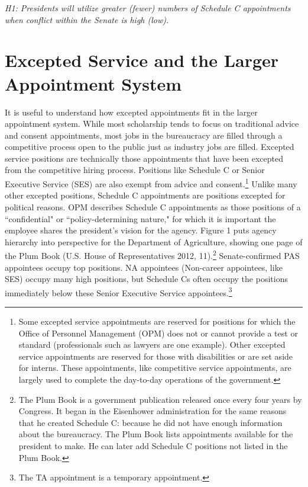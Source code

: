 \documentclass[12pt]{article}
\begin{document}
\textit{H1: Presidents will utilize greater (fewer) numbers of Schedule C appointments when conflict within the Senate is high (low).}

\section*{Excepted Service and the Larger Appointment System}

	It is useful to understand how excepted appointments fit in the larger appointment system. While most scholarship tends to focus on traditional advice and consent appointments, most jobs in the bureaucracy are filled through a competitive process open to the public just as industry jobs are filled. Excepted service positions are technically those appointments that have been excepted from the competitive hiring process. Positions like Schedule C or Senior Executive Service (SES) are also exempt from advice and consent.\footnote{Some excepted service appointments are reserved for positions for which the Office of Personnel Management (OPM) does not or cannot provide a test or standard (professionals such as lawyers are one example). Other excepted service appointments are reserved for those with disabilities or are set aside for interns. These appointments, like competitive service appointments, are largely used to complete the day-to-day operations of the government.}	Unlike many other excepted positions, Schedule C appointments are positions excepted for political reasons. OPM describes Schedule C appointments as those positions of a ``confidential" or ``policy-determining nature," for which it is important the employee shares the president's vision for the agency. Figure 1 puts agency hierarchy into perspective for the Department of Agriculture, showing one page of the Plum Book (U.S. House of Representatives 2012, 11).\footnote{The Plum Book is a government publication released once every four years by Congress. It began in the Eisenhower administration for the same reasons that he created Schedule C: because he did not have enough information about the bureaucracy. The Plum Book lists appointments available for the president to make. He can later add Schedule C positions not listed in the Plum Book.} Senate-confirmed PAS appointees occupy top positions. NA appointees (Non-career appointees, like SES) occupy many high positions, but Schedule Cs often occupy the positions immediately below these Senior Executive Service appointees.\footnote{The TA appointment is a temporary appointment.}
	
\end{document}
